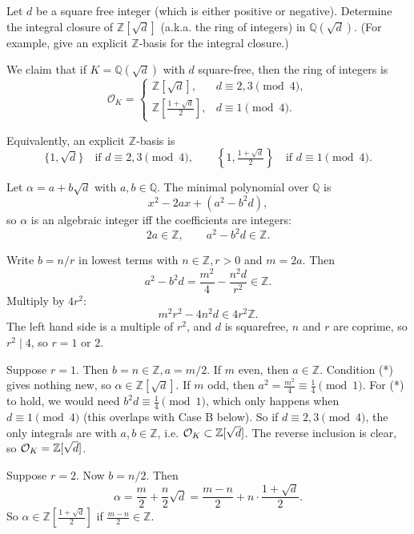 \documentclass[12pt]{article}  %
\begin{document}
\begin{problem}{4}
    Let $d$ be a square free integer (which is either positive or negative). Determine the integral closure of $\mathbb{Z}[\sqrt{d}]$ (a.k.a. the ring of integers) in $\mathbb{Q}(\sqrt{d})$. (For example, give an explicit $\mathbb{Z}$-basis for the integral closure.)
\end{problem}
\begin{solution}
We claim that if $K = \mathbb{Q}(\sqrt{d})$ with $d$ square-free, then the ring of integers is
\[
\mathcal{O}_K =
\begin{cases}
\mathbb{Z}[\sqrt{d}], & d \equiv 2,3 \pmod{4}, \\[6pt]
\mathbb{Z}\!\left[\frac{1+\sqrt{d}}{2}\right], & d \equiv 1 \pmod{4}.
\end{cases}
\]

Equivalently, an explicit $\mathbb{Z}$-basis is
\[
\{1, \sqrt{d}\} \quad \text{if } d \equiv 2,3 \pmod{4}, 
\qquad
\left\{1, \tfrac{1+\sqrt{d}}{2}\right\} \quad \text{if } d \equiv 1 \pmod{4}.
\]

Let $\alpha = a + b\sqrt{d}$ with $a,b \in \mathbb{Q}$. The minimal polynomial over $\mathbb{Q}$ is
\[
x^2 - 2ax + (a^2 - b^2 d),
\]
so $\alpha$ is an algebraic integer iff the coefficients are integers:
\[
2a \in \mathbb{Z}, 
\qquad 
a^2 - b^2 d \in \mathbb{Z}. 
\tag{$\ast$}
\]

Write $b=n/r$ in lowest terms with $n\in\mathbb Z, r>0$ and $m=2a$. Then
\[
a^2 - b^2 d = \frac{m^2}{4} - \frac{n^2 d}{r^2} \in \mathbb Z.
\]
Multiply by $4r^2$:
\[
m^2 r^2 - 4n^2 d \in 4r^2 \mathbb Z. 
\]
The left hand side is a multiple of $r^2$, and $d$ is squarefree, $n$ and $r$ are coprime, so $r^2 \mid 4$, so $r = 1$ or $2$. 

Suppose $r=1$. Then $b=n\in \mathbb Z, a=m/2$. If $m$ even, then $a\in\mathbb Z$. Condition (*) gives nothing new, so $\alpha\in \mathbb Z[\sqrt d]$. If $m$ odd, then $a^2=\tfrac{m^2}{4}\equiv \tfrac14\pmod 1$. For (*) to hold, we would need $b^2 d \equiv \tfrac14\pmod 1$, which only happens when $d\equiv 1\pmod 4$ (this overlaps with Case B below). So if $d\equiv 2,3\pmod 4$, the only integrals are with $a,b\in\mathbb Z$, i.e. ${\mathcal{O}}_K \subset \mathbb Z[\sqrt d]$. The reverse inclusion is clear, so ${\mathcal{O}}_K = \mathbb Z[\sqrt d]$.


Suppose $r=2$. Now $b=n/2$. Then
\[
\alpha = \frac{m}{2} + \frac{n}{2}\sqrt d
= \frac{m-n}{2} + n\cdot\frac{1+\sqrt d}{2}.
\]
So $\alpha\in \mathbb Z\left[\tfrac{1+\sqrt d}{2}\right]$ if $\tfrac{m-n}{2}\in\mathbb Z$.


\end{solution}
\end{document}
